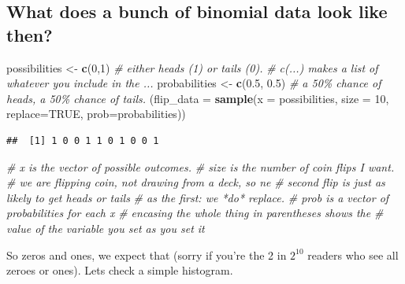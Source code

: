 \documentclass[
]{book}
\newenvironment{Shaded}{\begin{snugshade}}{\end{snugshade}}
\newcommand{\CommentTok}[1]{\textcolor[rgb]{0.56,0.35,0.01}{\textit{#1}}}
\newcommand{\DataTypeTok}[1]{\textcolor[rgb]{0.13,0.29,0.53}{#1}}
\newcommand{\DecValTok}[1]{\textcolor[rgb]{0.00,0.00,0.81}{#1}}
\newcommand{\FloatTok}[1]{\textcolor[rgb]{0.00,0.00,0.81}{#1}}
\newcommand{\KeywordTok}[1]{\textcolor[rgb]{0.13,0.29,0.53}{\textbf{#1}}}
\newcommand{\NormalTok}[1]{#1}
\newcommand{\OtherTok}[1]{\textcolor[rgb]{0.56,0.35,0.01}{#1}}
\newcommand{\StringTok}[1]{\textcolor[rgb]{0.31,0.60,0.02}{#1}}
\begin{document}
\hypertarget{what-does-a-bunch-of-binomial-data-look-like-then}{%
\subsection{What does a bunch of binomial data look like then?}\label{what-does-a-bunch-of-binomial-data-look-like-then}}

\begin{Shaded}
\begin{Highlighting}[]
\NormalTok{possibilities \textless{}{-}}\StringTok{ }\KeywordTok{c}\NormalTok{(}\DecValTok{0}\NormalTok{,}\DecValTok{1}\NormalTok{) }\CommentTok{\# either heads (1) or tails (0).}
                        \CommentTok{\# c(...) makes a list of whatever you include in the ...}
\NormalTok{probabilities \textless{}{-}}\StringTok{ }\KeywordTok{c}\NormalTok{(}\FloatTok{0.5}\NormalTok{, }\FloatTok{0.5}\NormalTok{)}
                        \CommentTok{\# a 50\% chance of heads, a 50\% chance of tails.}
\NormalTok{(}\DataTypeTok{flip\_data =} \KeywordTok{sample}\NormalTok{(}\DataTypeTok{x =}\NormalTok{ possibilities, }\DataTypeTok{size =} \DecValTok{10}\NormalTok{, }\DataTypeTok{replace=}\OtherTok{TRUE}\NormalTok{, }\DataTypeTok{prob=}\NormalTok{probabilities))}
\end{Highlighting}
\end{Shaded}

\begin{verbatim}
##  [1] 1 0 0 1 1 0 1 0 0 1
\end{verbatim}

\begin{Shaded}
\begin{Highlighting}[]
                        \CommentTok{\# x is the vector of possible outcomes.}
                        \CommentTok{\# size is the number of coin flips I want.}
                        \CommentTok{\# we are flipping coin, not drawing from a deck, so ne}
                        \CommentTok{\#   second flip is just as likely to get heads or tails}
                        \CommentTok{\#   as the first: we *do* replace.}
                        \CommentTok{\# prob is a vector of probabilities for each x}
                        \CommentTok{\# encasing the whole thing in parentheses shows the}
                        \CommentTok{\#   value of the variable you set as you set it}
\end{Highlighting}
\end{Shaded}

So zeros and ones, we expect that (sorry if you're the 2 in \(2^{10}\) readers who see all zeroes or ones). Lets check a simple histogram.
\end{document}
